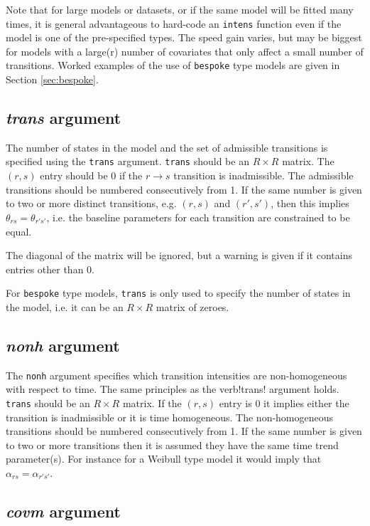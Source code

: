 \documentclass{article}
\numberwithin{equation}{section}
\begin{document}
Note that for large models or datasets, or if the same model will be fitted many times, it is general advantageous to hard-code an \verb!intens! function even if the model is one of the pre-specified types. The speed gain varies, but may be biggest for models with a large(r) number of covariates that only affect a small number of transitions. Worked examples of the use of \verb!bespoke! type models are given in Section \ref{sec:bespoke}.


\subsection{{\it trans} argument}

The number of states in the model and the set of admissible transitions is specified using the \verb!trans! argument. \verb!trans! should be an $R \times R$ matrix. The $(r,s)$ entry should be 0 if the $r \rightarrow s$ transition is inadmissible. The admissible transitions should be numbered consecutively from 1. If the same number is given to two or more distinct transitions, e.g. $(r,s)$ and $(r',s')$, then this implies $\theta_{rs} = \theta_{r's'}$, i.e. the baseline parameters for each transition are constrained to be equal.

The diagonal of the matrix will be ignored, but a warning is given if it contains entries other than 0.

For \verb!bespoke! type models, \verb!trans! is only used to specify the number of states in the model, i.e. it can be an $R \times R$ matrix of zeroes.

\subsection{{\it nonh} argument}

The \verb!nonh! argument specifies which transition intensities are non-homogeneous with respect to time. The same principles as the verb!trans! argument holds. \verb!trans! should be an $R \times R$ matrix. If the $(r,s)$ entry is 0 it implies either the transition is inadmissible or it is time homogeneous. The non-homogeneous transitions should be numbered consecutively from 1. If the same number is given to two or more transitions then it is assumed they have the same time trend parameter(s). For instance for a Weibull type model it would imply that $\alpha_{rs} = \alpha_{r's'}$.

\subsection{{\it covm} argument}
\end{document}

